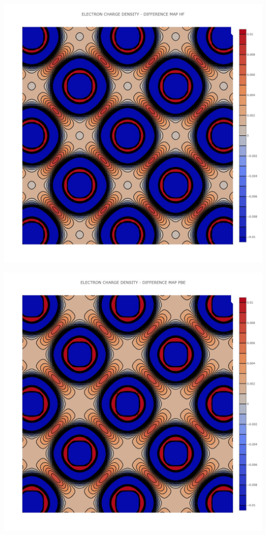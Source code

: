 \documentclass{article}
\begin{document}
\noindent\begin{minipage}{0.45\textwidth}
	\centering
	\includegraphics[width=1\textwidth]{../images/DIFFERENCE CHARGE DENSITY/DIFF CHARGE DENSITY HF.jpeg}
	\label{fig:CHARGE_HF}
\end{minipage}
\hfill
\begin{minipage}{0.45\textwidth}
	\centering
	\includegraphics[width=1\textwidth]{../images/DIFFERENCE CHARGE DENSITY/DIFF CHARGE DENSITY PBE.jpeg}
	\label{fig:CHARGE_PBE}
\end{minipage}
\end{document}
